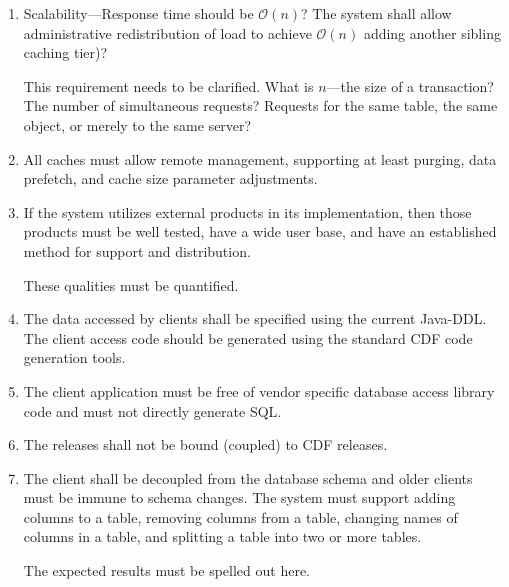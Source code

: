 \begin{enumerate}
\item

Scalability---Response time should be $\mathcal{O}(n)$?  The system shall
allow administrative redistribution of load to achieve $\mathcal{O}(n)$
\eg adding another sibling caching tier)?

\begin{fixme}
This requirement needs to be clarified. What is $n$---the size of a
transaction? The number of simultaneous requests? Requests for the
same table, the same object, or merely to the same server?
\end{fixme}

\item

All caches must allow remote management, supporting at least purging,
data prefetch, and cache size parameter adjustments.

\item

If the system utilizes external products in its implementation, then
those products must be well tested, have a wide user base, and have an
established method for support and distribution.

\begin{fixme}
These qualities must be quantified.
\end{fixme}

\item

The data accessed by clients shall be specified using the current
Java-DDL.  The client access code should be generated using the
standard CDF code generation tools.

\item

The client application must be free of vendor specific database access
library code and must not directly generate SQL.

\item

The \frontier releases shall not be bound (coupled) to CDF releases.

\item

The client shall be decoupled from the database schema and older
clients must be immune to schema changes. The system must support
adding columns to a table, removing columns from a table, changing
names of columns in a table, and splitting a table into two or more
tables.

\begin{fixme}
The expected results must be spelled out here.
\end{fixme}


\end{enumerate}
